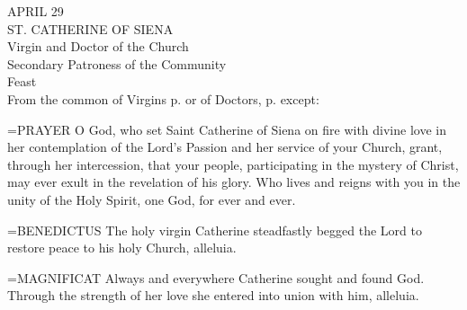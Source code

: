 \begin{center}\normalsize APRIL 29\\
\footnotesize ST. CATHERINE OF SIENA\\
\footnotesize Virgin and Doctor of the Church\\
\footnotesize Secondary Patroness of the Community\\
\footnotesize Feast\\
\footnotesize From the common of Virgins p.    or of Doctors, p.     except:\\
\end{center}

\hangindent=\parindent \small{PRAYER 
O God, who set Saint Catherine of Siena on fire with divine love
in her contemplation of the Lord's Passion
and her service of your Church,
grant, through her intercession,
that your people,
participating in the mystery of Christ,
may ever exult in the revelation of his glory.
Who lives and reigns with you in the unity of the Holy Spirit,
one God, for ever and ever.\\}
 
\hangindent=\parindent \small{BENEDICTUS  The holy virgin Catherine steadfastly begged the Lord to
restore peace to his holy Church, alleluia.\\}
 
\hangindent=\parindent \small{MAGNIFICAT  Always and everywhere Catherine sought and found
God. Through the strength of her love she entered into union with
him, alleluia.\\}
 
